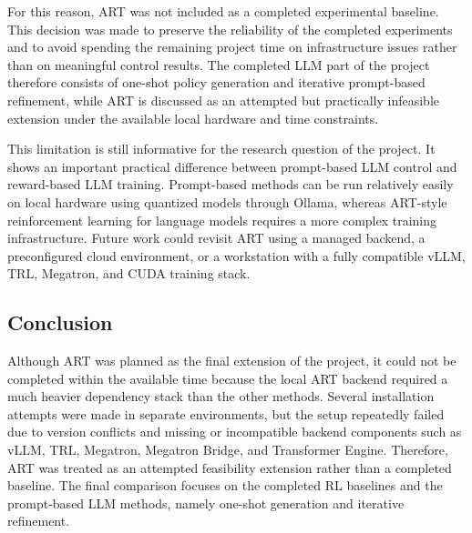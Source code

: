 \documentclass[11pt,a4paper]{article}
\begin{document}
For this reason, ART was not included as a completed experimental baseline. This decision was made to preserve the reliability of the completed experiments and to avoid spending the remaining project time on infrastructure issues rather than on meaningful control results. The completed LLM part of the project therefore consists of one-shot policy generation and iterative prompt-based refinement, while ART is discussed as an attempted but practically infeasible extension under the available local hardware and time constraints.

This limitation is still informative for the research question of the project. It shows an important practical difference between prompt-based LLM control and reward-based LLM training. Prompt-based methods can be run relatively easily on local hardware using quantized models through Ollama, whereas ART-style reinforcement learning for language models requires a more complex training infrastructure. Future work could revisit ART using a managed backend, a preconfigured cloud environment, or a workstation with a fully compatible vLLM, TRL, Megatron, and CUDA training stack.

\subsection{Conclusion}
Although ART was planned as the final extension of the project, it could not be completed within the available time because the local ART backend required a much heavier dependency stack than the other methods. Several installation attempts were made in separate environments, but the setup repeatedly failed due to version conflicts and missing or incompatible backend components such as vLLM, TRL, Megatron, Megatron Bridge, and Transformer Engine. Therefore, ART was treated as an attempted feasibility extension rather than a completed baseline. The final comparison focuses on the completed RL baselines and the prompt-based LLM methods, namely one-shot generation and iterative refinement.
\end{document}
